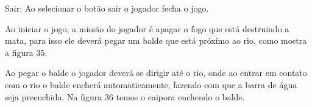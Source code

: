 Sair: Ao selecionar o botão sair o jogador fecha o jogo.

Ao iniciar o jogo, a missão do jogador é apagar o fogo que está destruindo a mata, para isso ele deverá pegar um balde que está próximo ao rio, como mostra a figura 35.

\pagebreak
\begin{figure}[h!]
		\centering
	\end{figure}

Ao pegar o balde o jogador deverá se dirigir até o rio, onde ao entrar em contato com o rio o balde encherá automaticamente, fazendo com que a barra de água seja preenchida. Na figura 36 temos o caipora enchendo o balde.

\begin{figure}[h!]
		\centering
	\end{figure}

